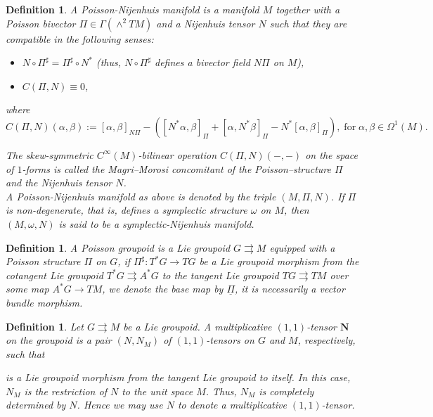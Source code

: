 \documentclass{article}
\newtheorem{definition}[theorem]{Definition}
\begin{document}
\begin{definition}\label{PNM}
A Poisson-Nijenhuis manifold is a manifold $M$ together with  a Poisson bivector $\Pi \in \Gamma(\wedge^2 TM)$ and a Nijenhuis tensor $N$ such that  they are compatible in the following senses:
\begin{itemize}
\item $N \circ \Pi^{\sharp}=\Pi^{\sharp} \circ N^\ast$ (thus, $N \circ \Pi^{\sharp}$ defines a bivector field $N \Pi$ on $M$),
\item $C(\Pi,N)\equiv 0$,
\end{itemize}
where
\begin{equation}
C(\Pi,N)(\alpha,\beta):=[\alpha,\beta]_{N\Pi}-([N^\ast \alpha,\beta]_\Pi+[\alpha,N^\ast \beta]_\Pi-N^\ast[\alpha,\beta]_\Pi),\; \text{for}\; \alpha, \beta \in \Omega^1(M).
\end{equation}

The skew-symmetric $C^\infty (M)$-bilinear operation $C(\Pi,N)(-,-)$ on the space of $1$-forms is called the Magri--Morosi concomitant  of the Poisson--structure $\Pi$ and the Nijenhuis tensor $N$.\\
A Poisson-Nijenhuis manifold as above is denoted by the triple $(M,\Pi,N)$. If $\Pi$ is non-degenerate, that is, defines a symplectic structure $\omega$ on $M$, then $(M,\omega,N)$ is said to be a symplectic-Nijenhuis manifold.
\end{definition}


\begin{definition}\label{PG}
A Poisson groupoid is a Lie groupoid $G\rightrightarrows M$ equipped with a Poisson structure $\Pi$ on $G$, if $\Pi^{\sharp}:T^\ast G \to TG$ be a Lie groupoid morphism from the cotangent Lie groupoid $T^{\ast} G \rightrightarrows A^\ast G$ to the tangent Lie groupoid $TG \rightrightarrows TM$ over some map $A^\ast G \to TM$, we denote the base map by $\underline \Pi$, it is necessarily a vector bundle morphism.
\end{definition}

\begin{definition}\label{MT}
Let $G \rightrightarrows M$ be a Lie groupoid. A multiplicative $(1,1)$-tensor $\mathbf{N}$ on the groupoid is a pair $(N,N_M)$ of $(1,1)$-tensors on $G$ and $M$, respectively, such that
\begin{center}
\end{center}
is a Lie groupoid morphism from the tangent Lie groupoid to itself. In this case, $N_M$ is the restriction of $N$ to the unit space $M$. Thus, $N_M$ is completely determined by $N$. Hence we may use $N$ to denote a multiplicative $(1,1)$-tensor.
\end{definition}
\end{document}

